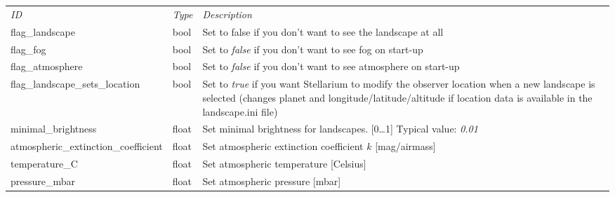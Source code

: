 \section{}\label{sec:config.ini:landscape}

\begin{longtabu} to \textwidth {l|l|X}\toprule
\emph{ID} & \emph{Type} & \emph{Description}\\
flag\_landscape                 & bool & Set to false if you don't want to see the landscape at all\\\midrule
flag\_fog                       & bool & Set to \emph{false} if you don't want to see fog on start-up\\\midrule
flag\_atmosphere                & bool & Set to \emph{false} if you don't want to see atmosphere on start-up\\\midrule
flag\_landscape\_sets\_location & bool & Set to \emph{true} if you want Stellarium to modify the observer location 
                                         when a new landscape is selected (changes planet and longitude/latitude/altitude 
                                         if location data is available in the landscape.ini file)\\\midrule
minimal\_brightness                  & float & Set minimal brightness for landscapes. [0\ldots1] Typical value: \emph{0.01}\\\midrule
atmospheric\_extinction\_coefficient & float & Set atmospheric extinction coefficient $k$ [mag/airmass]\\\midrule
temperature\_C                       & float & Set atmospheric temperature [Celsius]\\\midrule
pressure\_mbar                       & float & Set atmospheric pressure [mbar]\\\bottomrule
\end{longtabu}

\section{}\label{sec:config.ini:localization}

